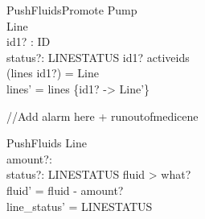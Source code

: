 \documentclass{article}
\begin{document}
	\begin{schema}{PushFluidsPromote}
		\Delta Pump	\\
		\Delta Line \\
		id1? : ID \\
		status?: LINESTATUS
	\where 
		id1? \in activeids \\
		(lines id1?) = \theta Line \\
		lines' = lines \oplus \{id1? -> \theta Line'\} \\		
	\end{schema}
	
	//Add alarm here + runoutofmedicene
	\begin{schema}{PushFluids}
		\Delta Line \\
		amount?: \nat \\
		status?: LINESTATUS
	\where 
		fluid > what? \\
		fluid' = fluid - amount? \\
		line_status' = LINESTATUS
	\end{schema}
\end{document}
